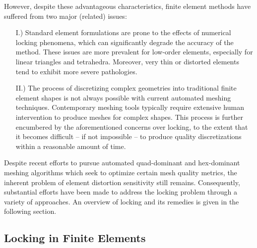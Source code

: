 	However, despite these advantageous characteristics, finite element methods have suffered from two major (related) issues:
	\begin{itemize}
		\item[I.)] Standard element formulations are prone to the effects of numerical locking phenomena, which can significantly degrade the accuracy of the method. These issues are more prevalent for low-order elements, especially for linear triangles and tetrahedra. Moreover, very thin or distorted elements tend to exhibit more severe pathologies.
		\item[II.)] The process of discretizing complex geometries into traditional finite element shapes is not always possible with current automated meshing techniques. Contemporary meshing tools typically require extensive human intervention to produce meshes for complex shapes. This process is further encumbered by the aforementioned concerns over locking, to the extent that it becomes difficult -- if not impossible -- to produce quality discretizations within a reasonable amount of time.
	\end{itemize}
	
	Despite recent efforts to pursue automated quad-dominant \cite{Remacle:12} and hex-dominant \cite{Xifeng:17} meshing algorithms which seek to optimize certain mesh quality metrics, the inherent problem of element distortion sensitivity still remains. Consequently, substantial efforts have been made to address the locking problem through a variety of approaches. An overview of locking and its remedies is given in the following section.

	\subsection*{Locking in Finite Elements}
	
